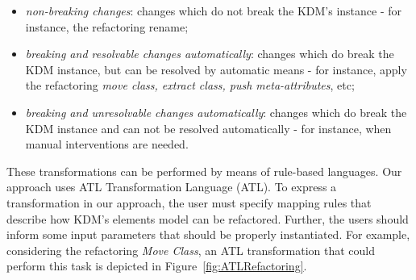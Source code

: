 \begin{itemize}
\item \textit{non-breaking changes}: changes which do not break the KDM's instance - for instance, the refactoring rename;

\item \textit{breaking and resolvable changes automatically}: changes which do break the KDM instance, but can be resolved by automatic means - for instance, apply the refactoring \textit{move class, extract class, push meta-attributes}, etc;

\item \textit{breaking and unresolvable changes automatically}: changes which do break the KDM instance and can not be resolved automatically - for instance, when manual interventions are needed.
%
\end{itemize} 
%
These transformations can be performed by means of rule-based languages. Our approach uses ATL Transformation Language (ATL). %
%
To express a transformation in our approach, the user must specify mapping rules that describe how KDM's elements model can be refactored. Further, the users should inform some input parameters that should be properly instantiated. For example, considering the refactoring \textit{Move Class}, an ATL transformation that could perform this task is depicted in Figure~\ref{fig:ATLRefactoring}.










